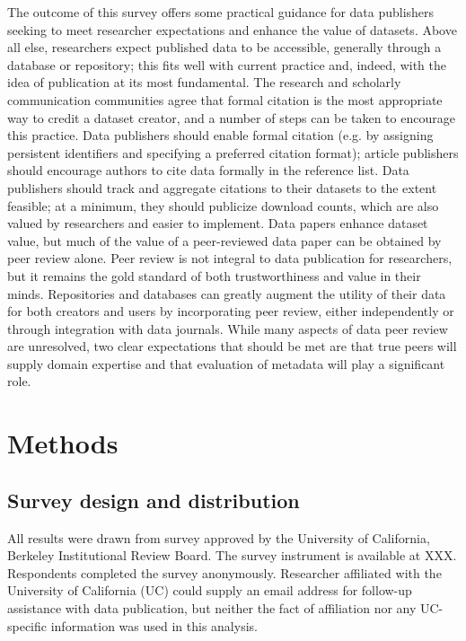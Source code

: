 \documentclass[10pt]{article}
\begin{document}
The outcome of this survey offers some practical guidance for data publishers seeking to meet researcher expectations and enhance the value of datasets.
Above all else, researchers expect published data to be accessible, generally through a database or repository; this fits well with current practice and, indeed, with the idea of publication at its most fundamental.
The research and scholarly communication communities agree that formal citation is the most appropriate way to credit a dataset creator, and a number of steps can be taken to encourage this practice.
Data publishers should enable formal citation (e.g. by assigning persistent identifiers and specifying a preferred citation format); article publishers should encourage authors to cite data formally in the reference list.
Data publishers should track and aggregate citations to their datasets to the extent feasible; at a minimum, they should publicize download counts, which are also valued by researchers and easier to implement.
Data papers enhance dataset value, but much of the value of a peer-reviewed data paper can be obtained by peer review alone.
Peer review is not integral to data publication for researchers, but it remains the gold standard of both trustworthiness and value in their minds.
Repositories and databases can greatly augment the utility of their data for both creators and users by incorporating peer review, either independently or through integration with data journals.
While many aspects of data peer review are unresolved, two clear expectations that should be met are that true peers will supply domain expertise and that evaluation of metadata will play a significant role.


\section*{Methods}

\subsection*{Survey design and distribution}
All results were drawn from survey approved by the University of California, Berkeley Institutional Review Board. %
The survey instrument is available at XXX.
Respondents completed the survey anonymously.
Researcher affiliated with the University of California (UC) could supply an email address for follow-up assistance with data publication, but neither the fact of affiliation nor any UC-specific information was used in this analysis.
\end{document}
